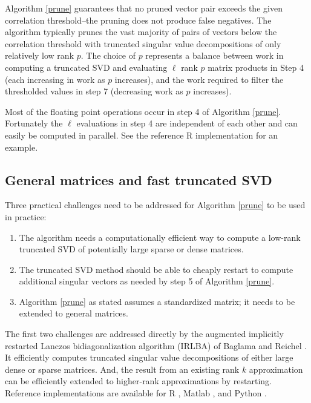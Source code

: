\documentclass{article}
\let\proglang=\textsf
\numberwithin{algorithmctr}{section}
\begin{document}
Algorithm \ref{prune} guarantees that no pruned vector pair exceeds the given
correlation threshold--the pruning does not produce false negatives.  The
algorithm typically prunes the vast majority of pairs of vectors below the
correlation threshold with truncated singular value decompositions of only
relatively low rank $p$.  The choice of $p$ represents a balance between work
in computing a truncated SVD and evaluating $\ell$ rank $p$ matrix products in
Step 4 (each increasing in work as $p$ increases), and the work required to
filter the thresholded values in step 7 (decreasing work as $p$ increases).

Most of the floating point operations occur in step 4 of Algorithm \ref{prune}.
Fortunately the $\ell$ evaluations in step 4 are independent of each other and
can easily be computed in parallel. See the reference \proglang{R}
implementation \cite{sup} for an example.


\subsection{General matrices and fast truncated SVD}\label{irlba}

Three practical challenges need to be addressed for Algorithm \ref{prune} to be
used in practice:
\begin{enumerate}
\item The algorithm needs a computationally efficient way to compute
a low-rank truncated SVD of potentially large sparse or dense matrices.
\item The truncated SVD method should be able to cheaply restart to
compute additional singular vectors as needed by step 5 of Algorithm
\ref{prune}.
\item Algorithm \ref{prune} as stated assumes a standardized matrix;
it needs to be extended to general matrices.
\end{enumerate}

The first two challenges are addressed directly by the augmented implicitly
restarted Lanczos bidiagonalization algorithm (IRLBA) of Baglama and Reichel
\cite{irlba}. It efficiently computes truncated singular value decompositions
of either large dense or sparse matrices. And, the result from an existing rank
$k$ approximation can be efficiently extended to higher-rank approximations by
restarting.  Reference implementations are available for \proglang{R}
\cite{irlbar}, \proglang{Matlab} \cite{irlbam}, and \proglang{Python}
\cite{irlbap}.
\end{document}
